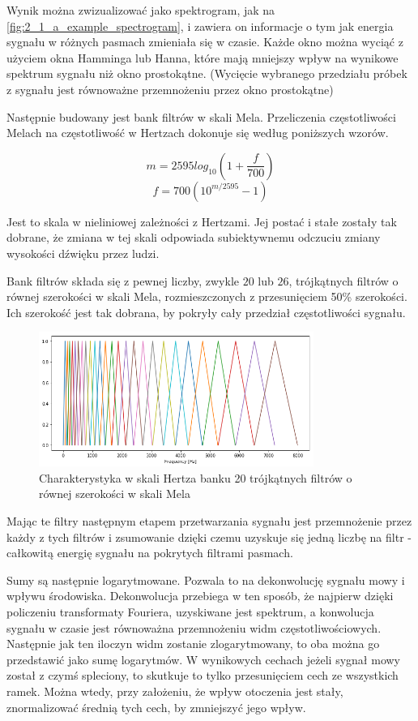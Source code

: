 Wynik  można zwizualizować jako spektrogram, jak na \ref{fig:2_1_a_example_spectrogram},
i zawiera on informacje o tym jak energia sygnału w różnych pasmach zmieniała się w czasie.
Każde okno można wyciąć z użyciem okna Hamminga lub Hanna, które mają mniejszy wpływ
na wynikowe spektrum sygnału niż okno prostokątne. (Wycięcie wybranego przedziału próbek
z sygnału jest równoważne przemnożeniu przez okno prostokątne)

Następnie budowany jest bank filtrów w skali Mela. Przeliczenia częstotliwości Melach na
częstotliwość w Hertzach dokonuje się według poniższych wzorów.

$$m = 2595 log_{10}(1 + \frac{f}{700})$$
$$f = 700 (10^{m/2595} - 1)$$

Jest to skala w nieliniowej zależności z Hertzami. Jej postać i stałe zostały tak dobrane,
że zmiana w tej skali odpowiada subiektywnemu odczuciu zmiany wysokości dźwięku przez ludzi.

Bank filtrów składa się z pewnej liczby, zwykle $20$ lub $26$, trójkątnych filtrów o równej
szerokości w skali Mela, rozmieszczonych z przesunięciem 50\% szerokości. Ich szerokość
jest tak dobrana, by pokryły cały przedział częstotliwości sygnału.

\begin{figure}[H]
    \centering
    \includegraphics[width=0.8\textwidth]{images/2_1_d_mel_filters}
    \caption{Charakterystyka w skali Hertza banku 20 trójkątnych filtrów o równej szerokości w skali Mela}
    \label{fig:2_1_d_mel_filters}
\end{figure}

Mając te filtry następnym etapem przetwarzania sygnału jest przemnożenie przez każdy z tych filtrów i zsumowanie
dzięki czemu uzyskuje się jedną liczbę na filtr - całkowitą energię sygnału na pokrytych filtrami pasmach.

Sumy są następnie logarytmowane. Pozwala to na dekonwolucję sygnału mowy i wpływu środowiska.
Dekonwolucja przebiega w ten sposób, że najpierw dzięki policzeniu transformaty Fouriera,
uzyskiwane jest spektrum, a konwolucja sygnału w czasie jest równoważna przemnożeniu widm częstotliwościowych.
Następnie jak ten iloczyn widm zostanie zlogarytmowany, to oba można go przedstawić jako sumę logarytmów.
W wynikowych cechach jeżeli sygnał mowy został z czymś spleciony, to skutkuje to tylko przesunięciem cech
ze wszystkich ramek. Można wtedy, przy założeniu, że wpływ otoczenia jest stały, znormalizować średnią tych cech,
by zmniejszyć jego wpływ.


